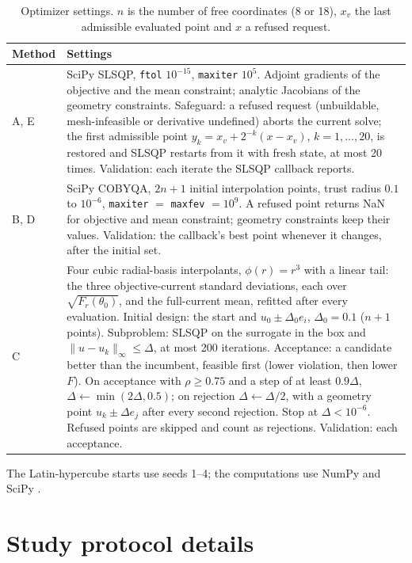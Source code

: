 \documentclass{anvil-paper}
\begin{document}
\begin{table}[H]\centering\small
\caption{Optimizer settings. $n$ is the number of free coordinates (8 or
18), $x_v$ the last admissible evaluated point and $x$ a refused request.}
\label{tab:settings}
\begin{tabular}{>{\raggedright\arraybackslash}p{.11\linewidth}>{\raggedright\arraybackslash}p{.83\linewidth}}\toprule
Method & Settings\\\midrule
A, E & SciPy SLSQP, \texttt{ftol} $10^{-15}$, \texttt{maxiter} $10^5$. Adjoint gradients of the objective and the mean constraint; analytic Jacobians of the geometry constraints. Safeguard: a refused request (unbuildable, mesh-infeasible or derivative undefined) aborts the current solve; the first admissible point $y_k=x_v+2^{-k}(x-x_v)$, $k=1,\ldots,20$, is restored and SLSQP restarts from it with fresh state, at most 20 times. Validation: each iterate the SLSQP callback reports.\\
B, D & SciPy COBYQA, $2n+1$ initial interpolation points, trust radius $0.1$ to $10^{-6}$, \texttt{maxiter} $=$ \texttt{maxfev} $=10^9$. A refused point returns NaN for objective and mean constraint; geometry constraints keep their values. Validation: the callback's best point whenever it changes, after the initial set.\\
C & Four cubic radial-basis interpolants, $\phi(r)=r^3$ with a linear tail: the three objective-current standard deviations, each over $\sqrt{F_r(\theta_0)}$, and the full-current mean, refitted after every evaluation. Initial design: the start and $u_0\pm\Delta_0e_i$, $\Delta_0=0.1$ ($n+1$ points). Subproblem: SLSQP on the surrogate in the box and $\|u-u_k\|_\infty\leq\Delta$, at most 200 iterations. Acceptance: a candidate better than the incumbent, feasible first (lower violation, then lower $F$). On acceptance with $\rho\geq0.75$ and a step of at least $0.9\Delta$, $\Delta\leftarrow\min(2\Delta,0.5)$; on rejection $\Delta\leftarrow\Delta/2$, with a geometry point $u_k\pm\Delta e_j$ after every second rejection. Stop at $\Delta<10^{-6}$. Refused points are skipped and count as rejections. Validation: each acceptance.\\
\bottomrule\end{tabular}
\end{table}

The Latin-hypercube starts \citep{mckay1979comparison} use seeds 1--4;
the computations use NumPy \citep{harris2020array} and SciPy
\citep{virtanen2020scipy}.

\section{Study protocol details}\label{sec:protocol-details}
\end{document}
